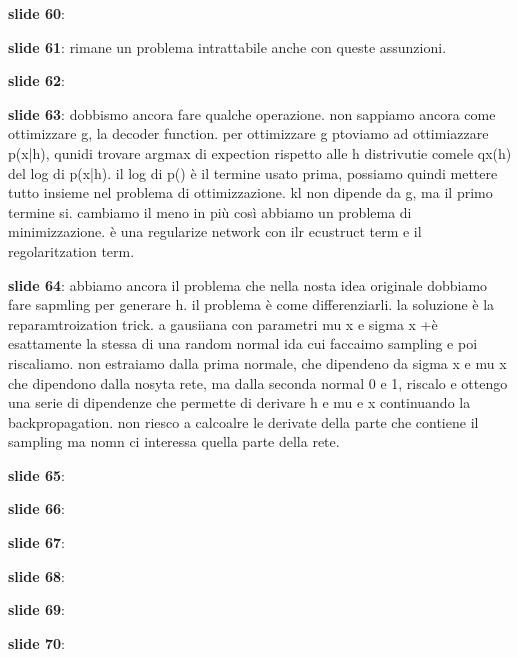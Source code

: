 \textbf{slide 60}: 

\textbf{slide 61}: rimane un problema intrattabile anche con queste assunzioni. 

\textbf{slide 62}: 

\textbf{slide 63}: dobbismo ancora fare qualche operazione. non sappiamo ancora come ottimizzare g, la decoder
function. per ottimizzare g ptoviamo ad ottimiazzare p(x|h), qunidi trovare argmax di expection rispetto alle
h distrivutie comele qx(h) del log di p(x|h). il log di p() è il termine usato prima, possiamo quindi mettere
tutto insieme nel problema di ottimizzazione. kl non dipende da g, ma il primo termine si. cambiamo il meno
in più così abbiamo un problema di minimizzazione. è una regularize network con ilr ecustruct term e il 
regolaritzation term.

\textbf{slide 64}: abbiamo ancora il problema che nella nosta idea originale dobbiamo fare sapmling per
generare h. il problema è come differenziarli. la soluzione è la reparamtroization trick. a gausiiana con
parametri mu x e sigma x +è esattamente la stessa di una random normal ida cui faccaimo sampling e poi 
riscaliamo. non estraiamo dalla prima normale, che dipendeno da sigma x e mu x che dipendono dalla nosyta rete,
ma dalla seconda normal 0 e 1, riscalo e ottengo una serie di dipendenze che permette di derivare h e mu e x
continuando la backpropagation. non riesco a calcoalre le derivate della parte che contiene il sampling ma
nomn ci interessa quella parte della rete. 

\textbf{slide 65}:

\textbf{slide 66}:

\textbf{slide 67}:

\textbf{slide 68}: 

\textbf{slide 69}:

\textbf{slide 70}: